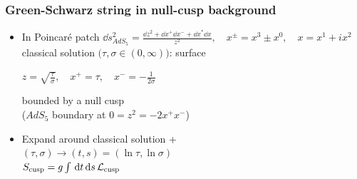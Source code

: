 \documentclass{beamer}
\begin{document}
%
%
%

\begin{frame}
\frametitle{Green-Schwarz string in null-cusp background}

\begin{itemize}
\item In Poincaré patch\vspace{2mm}
$\dd s^{2}_{AdS_{5}} = \frac{\dd z^{2} + \dd x^{+}\dd x^{-} + \dd x^{*}\dd x}{z^{2}}, \quad x^{\pm}=x^{3}\pm x^{0}, \quad x=x^{1}+ix^{2}$\vspace{2mm}
classical solution $\big(\tau,\sigma \in (0,\infty)\big)$: surface\vspace{2mm}
\begin{center}
$z = \sqrt{\frac{\tau}{\sigma}},\quad x^{+}=\tau,\quad x^{-}= -\frac{1}{2\sigma}$ 
\end{center}
\vspace{2mm}
bounded by a null cusp \\ ($AdS_{5}$ boundary at $0=z^{2}=-2x^{+}x^{-}$)
%
\item Expand around classical solution + \\{\small $(\tau,\sigma) \to (t,s)=(\ln \tau,\ln \sigma)$}\\
\vspace{2mm}
{\small $S_{\rm cusp} = g\int \, \mathrm{d} t\, \mathrm{d} s\, \mathcal{L}_{\rm cusp}$}



\end{itemize}
\end{frame}
\end{document}
